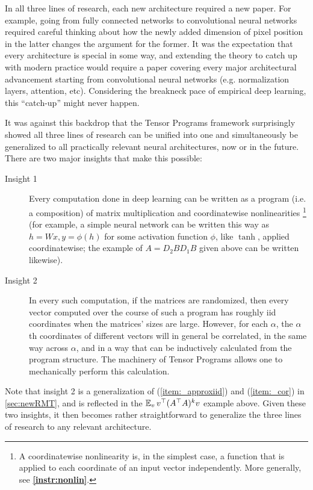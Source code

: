 \documentclass{article}
\theoremstyle{definition}
\theoremstyle{remark}
\newcommand{\trsp}{\top}
\newcommand{\refNonlin}{\textbf{\ref{instr:nonlin}}}
\begin{document}
In all three lines of research, each new architecture required a new paper. For example, going from fully connected networks to convolutional neural networks required careful thinking about how the newly added dimension of pixel position in the latter changes the argument for the former. It was the expectation that every architecture is special in some way, and extending the theory to catch up with modern practice would require a paper covering every major architectural advancement starting from convolutional neural networks (e.g. normalization layers, attention, etc). Considering the breakneck pace of empirical deep learning, this ``catch-up'' might never happen.

It was against this backdrop that the Tensor Programs framework \citep{yangScalingLimitsWide2019arXiv.org,yangTP1,yangTP2} surprisingly showed all three lines of research can be unified into one and simultaneously be generalized to all practically relevant neural architectures, now or in the future. There are two major insights that make this possible: 
\begin{description}
  \item[Insight 1] Every computation done in deep learning can be written as a program (i.e. a composition) of matrix multiplication and coordinatewise nonlinearities%
  \footnote{A coordinatewise nonlinearity is, in the simplest case, a function that is applied to each coordinate of an input vector independently. More generally, see \refNonlin{}.} (for example, a simple neural network can be written this way as $h=Wx,y=\phi(h)$ for some activation function $\phi$, like $\tanh$, applied coordinatewise; the example of $A=D_{2}BD_{1}B$ given above can be written likewise).
  \item[Insight 2] In every such computation, if the matrices are randomized, then every vector computed over the course of such a program has roughly iid coordinates when the matrices' sizes are large. However, for each $\alpha$, the $\alpha$th coordinates of different vectors will in general be correlated, in the same way across $\alpha$, and in a way that can be inductively calculated from the program structure. The machinery of Tensor Programs allows one to mechanically perform this calculation.
\end{description}
Note that insight 2 is a generalization of (\ref{item:_approxiid}) and (\ref{item:_cor}) in \cref{sec:newRMT}, and is reflected in the $\EV_v v^\trsp (A^\trsp A)^k v$ example above.
Given these two insights, it then becomes rather straightforward to generalize the three lines of research to any relevant architecture.
\end{document}

